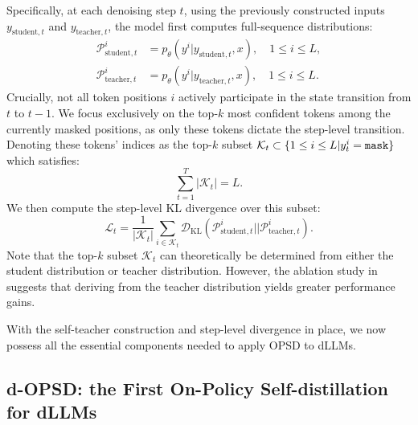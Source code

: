 \documentclass{article}
\begin{document}
Specifically, at each denoising step $t$, using the previously constructed inputs $y_{\text{student},t}$ and $y_{\text{teacher},t}$, the model first computes full-sequence distributions:
\begin{equation}
\begin{aligned}
    \mathcal{P}_{\text{student}, t}^i &= p_\theta(y^i|y_{\text{student},t}, x), \quad 1 \leq i \leq L, \\
    \mathcal{P}_{\text{teacher}, t}^i &= p_\theta(y^i|y_{\text{teacher},t}, x), \quad 1 \leq i \leq L.
\end{aligned}
\label{eq10}
\end{equation}
Crucially, not all token positions $i$ actively participate in the state transition from $t$ to $t-1$. We focus exclusively on the top-$k$ most confident tokens among the currently masked positions, as only these tokens dictate the step-level transition. Denoting these tokens' indices as the top-$k$ subset $\mathcal{K}_t \subset \{ 1 \leq i \leq L | y_t^i = {\texttt{mask}}  \}$ which satisfies:
\begin{equation}
    \sum_{t=1}^T |\mathcal{K}_t|= L.
\end{equation}
We then compute the step-level KL divergence over this subset:
\begin{equation}
    \mathcal{L}_t = \frac{1}{|\mathcal{K}_t|}  \sum_{i \in \mathcal{K}_t}  \mathcal{D}_\text{KL} \left(  \mathcal{P}_{\text{student}, t}^i || \mathcal{P}_{\text{teacher}, t}^i \right).
\end{equation}
Note that the top-$k$ subset $\mathcal{K}_t$ can theoretically be determined from either the student distribution or teacher distribution. However, the ablation study in  suggests that deriving from the teacher distribution yields greater performance gains.

With the self-teacher construction and step-level divergence in place, we now possess all the essential components needed to apply OPSD to dLLMs.


\subsection{d-OPSD: the First On-Policy Self-distillation for dLLMs} \label{sec3.3}
\end{document}
